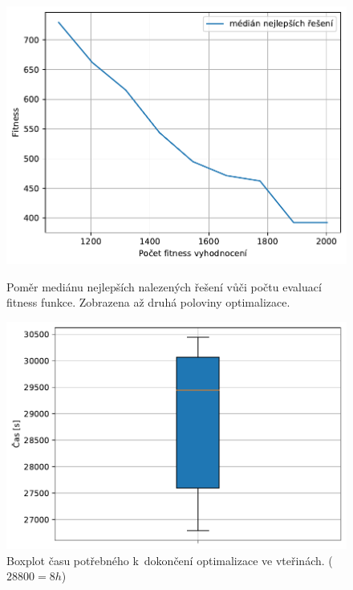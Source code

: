 \begin{figure}[H]
\begin{minipage}[t]{0.475\linewidth}
	\includegraphics[width=\textwidth]{obrazky-figures/statistics/HIFU/flower/15/GA/bestsToFitness_1.pdf}
	\caption{Poměr mediánu nejlepších nalezených řešení vůči počtu evaluací fitness funkce. Zobrazena až druhá poloviny optimalizace.}
	\label{fg:hifu:flower:ga:fitPerf}
\end{minipage}
\hfill
\begin{minipage}[t]{0.475\linewidth}
\includegraphics[width=\linewidth]{obrazky-figures/statistics/HIFU/flower/15/GA/timeBoxplot_WithOutliers.pdf}
\caption{Boxplot času potřebného k~dokončení optimalizace ve vteřinách. ($28800 = 8h$)}
\label{fg:hifu:flower:ga:time}
\end{minipage}
\end{figure}

